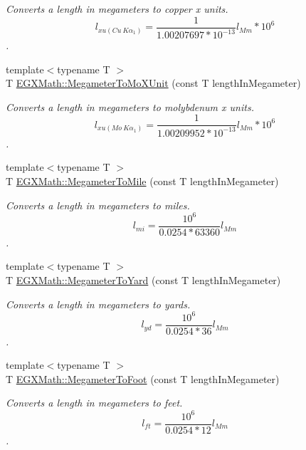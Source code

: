 \begin{DoxyCompactItemize}
\begin{DoxyCompactList}\small\item\em Converts a length in megameters to copper x units. \[ l_{xu(Cu\ K\alpha_1)}= \frac{1}{1.00207697*10^{-13}} l_{Mm} * 10^{6}\]. \end{DoxyCompactList}\item 
{\footnotesize template$<$typename T $>$ }\\T \mbox{\hyperlink{group___e_g_x_math-_conversions-_length_conversions-_s_i-_megameter-_non-_s_i_ga134a9fb2603b93c739c4ee58864f69c6}{E\+G\+X\+Math\+::\+Megameter\+To\+Mo\+X\+Unit}} (const T length\+In\+Megameter)
\begin{DoxyCompactList}\small\item\em Converts a length in megameters to molybdenum x units. \[ l_{xu(Mo\ K\alpha_1)}=\frac{1}{1.00209952*10^{-13}} l_{Mm} * 10^{6}\]. \end{DoxyCompactList}\item 
{\footnotesize template$<$typename T $>$ }\\T \mbox{\hyperlink{group___e_g_x_math-_conversions-_length_conversions-_s_i-_megameter-_imperial_gaa20a079fd7502961010c93e0091ab17c}{E\+G\+X\+Math\+::\+Megameter\+To\+Mile}} (const T length\+In\+Megameter)
\begin{DoxyCompactList}\small\item\em Converts a length in megameters to miles. \[ l_{mi}=\frac{10^{6}}{0.0254 * 63360} l_{Mm} \]. \end{DoxyCompactList}\item 
{\footnotesize template$<$typename T $>$ }\\T \mbox{\hyperlink{group___e_g_x_math-_conversions-_length_conversions-_s_i-_megameter-_imperial_gae8b77cb5d4f8cf566968e18dde870c74}{E\+G\+X\+Math\+::\+Megameter\+To\+Yard}} (const T length\+In\+Megameter)
\begin{DoxyCompactList}\small\item\em Converts a length in megameters to yards. \[ l_{yd}= \frac{10^{6}}{0.0254 * 36} l_{Mm} \]. \end{DoxyCompactList}\item 
{\footnotesize template$<$typename T $>$ }\\T \mbox{\hyperlink{group___e_g_x_math-_conversions-_length_conversions-_s_i-_megameter-_imperial_ga5586abd81d8635465b9be7f9be5fadc7}{E\+G\+X\+Math\+::\+Megameter\+To\+Foot}} (const T length\+In\+Megameter)
\begin{DoxyCompactList}\small\item\em Converts a length in megameters to feet. \[ l_{ft}= \frac{10^{6}}{0.0254 * 12} l_{Mm} \]. \end{DoxyCompactList}\item 

\end{DoxyCompactItemize}
